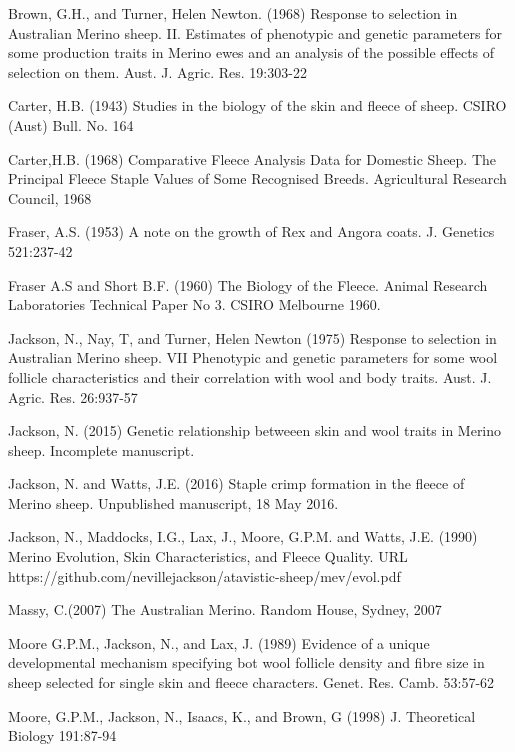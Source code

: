 \documentclass[titlepage]{article}  %
\begin{document}
\clearpage
\begin{thebibliography}{99}

Brown, G.H., and Turner, Helen Newton. (1968) Response to selection in Australian Merino sheep. II. Estimates of phenotypic and genetic parameters for some production traits in Merino ewes and an analysis of the possible effects of selection on them. Aust. J. Agric. Res. 19:303-22

Carter, H.B. (1943) Studies in the biology of the skin and fleece of sheep. CSIRO (Aust) Bull. No. 164

Carter,H.B. (1968) Comparative Fleece Analysis Data for Domestic Sheep. The Principal Fleece Staple Values of Some Recognised Breeds. Agricultural Research Council, 1968
 
Fraser, A.S. (1953) A note on the growth of Rex and Angora coats. J. Genetics 521:237-42

Fraser A.S and Short B.F. (1960) The Biology of the Fleece. Animal Research Laboratories Technical Paper No 3. CSIRO Melbourne 1960.

Jackson, N., Nay, T, and Turner, Helen Newton (1975) Response to selection in Australian Merino sheep. VII Phenotypic and genetic parameters for some wool follicle characteristics and their correlation with wool and body traits. Aust. J. Agric. Res. 26:937-57

Jackson, N. (2015) Genetic relationship betweeen skin and wool traits in Merino sheep. Incomplete manuscript.

Jackson, N. and Watts, J.E. (2016) Staple crimp formation in the fleece of Merino sheep. Unpublished manuscript, 18 May 2016.

Jackson, N., Maddocks, I.G., Lax, J., Moore, G.P.M. and Watts, J.E. (1990) Merino Evolution, Skin Characteristics, and Fleece Quality. URL https://github.com/nevillejackson/atavistic-sheep/mev/evol.pdf 

Massy, C.(2007) The Australian Merino. Random House, Sydney, 2007

Moore G.P.M., Jackson, N., and Lax, J. (1989) Evidence of a unique developmental mechanism specifying bot wool follicle density and fibre size in sheep selected for single skin and fleece characters. Genet. Res. Camb. 53:57-62

Moore, G.P.M., Jackson, N., Isaacs, K., and Brown, G (1998) J. Theoretical Biology 191:87-94



\end{thebibliography}
\end{document}
